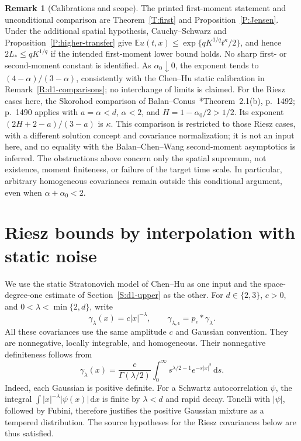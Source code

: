\documentclass[12pt]{article}
\numberwithin{equation}{section}
\theoremstyle{definition}
\newtheorem{remark}[theorem]{Remark}
\newcommand{\E}{\mathbb{E}}
\newcommand{\ud}{\,\mathrm{d}}
\begin{document}
\begin{remark}[Calibrations and scope]\label{R:higher-calibrations}
  The printed first-moment statement and unconditional comparison are
  Theorem~\ref{T:first} and Proposition~\ref{P:Jensen}. Under the
  additional spatial hypothesis, Cauchy--Schwarz and
  Proposition~\ref{P:higher-transfer} give
  $\E u(t,x)\le\exp\{qK^{1/q}t^\kappa/2\}$, and hence
  $2L_*\le qK^{1/q}$ if the intended first-moment lower bound holds.
  No sharp first- or second-moment constant is
  identified. As $\alpha_0\downarrow0$, the exponent tends to
  $(4-\alpha)/(3-\alpha)$, consistently with the Chen--Hu static
  calibration in Remark~\ref{R:d1-comparisons}; no interchange of limits
  is claimed. For the Riesz cases here, the Skorohod comparison of
  Balan--Conus~\cite{balan.conus:16:intermittency}*{Theorem~2.1(b),
  p.~1492; p.~1490} applies with $a=\alpha<d$, $\alpha<2$, and
  $H=1-\alpha_0/2>1/2$. Its exponent
  $(2H+2-a)/(3-a)$ is $\kappa$. This comparison is restricted to
  those Riesz cases, with a different solution concept and covariance
  normalization; it is not an input here, and no equality with the
  Balan--Chen--Wang second-moment asymptotics is inferred. The
  obstructions above concern only the spatial supremum, not existence,
  moment finiteness, or failure of the target time scale. In particular,
  arbitrary homogeneous covariances remain outside this conditional
  argument, even when $\alpha+\alpha_0<2$.
\end{remark}

\section{Riesz bounds by interpolation with static noise}
\label{S:static-holder}


We use the static Stratonovich model of Chen--Hu as one input and the
space-degree-one estimate of Section~\ref{S:d1-upper} as the other.
For $d \in \{2,3\}$, $c > 0$, and $0 < \lambda < \min\{2,d\}$, write
\[
  \gamma_\lambda(x)=c|x|^{-\lambda},\qquad
  \gamma_{\lambda,\epsilon}=p_\epsilon*\gamma_\lambda.
\]
All these covariances use the same amplitude $c$ and Gaussian convention.
They are nonnegative, locally integrable, and homogeneous. Their nonnegative
definiteness follows from
\[
  \gamma_\lambda(x)=\frac{c}{\Gamma(\lambda/2)}
  \int_0^\infty s^{\lambda/2-1}e^{-s|x|^2}\ud s.
\]
Indeed, each Gaussian is positive definite. For a Schwartz autocorrelation
$\psi$, the integral $\int |x|^{-\lambda}|\psi(x)|\ud x$ is finite by
$\lambda < d$ and rapid decay. Tonelli with $|\psi|$, followed by Fubini,
therefore justifies the positive Gaussian mixture as a tempered distribution.
The source hypotheses for the Riesz covariances below are thus satisfied.
\end{document}
